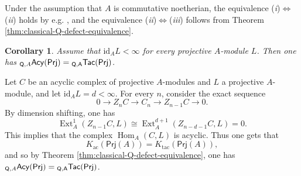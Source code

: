 \documentclass{amsart}
\theoremstyle{bfupright head,slanted body}
\theoremstyle{bfupright head,upright body}
\theoremstyle{fixed bf head,slanted body}
\newtheorem{cor}[res]{Corollary}        \newtheorem*{cor*}{Corollary}
\theoremstyle{fixed bf head,upright body}
\theoremstyle{numbered paragraph}
\newcounter{eqc}
\newenvironment{prf*}[1][Proof]{%
	\begin{proof}[\bf #1]
		\setcounter{equation}{0}
		\renewcommand{\theequation}{\arabic{equation}}}
	{\end{proof}
}
\newcommand{\eqclbl}[1]{{\upshape(\textit{#1})}}
\numberwithin{equation}{res}
\newcommand{\TacQ}{{}_{\Q,A}\mathsf{Tac}(\sf Prj)}
\newcommand{\AcQ}{{}_{\Q,A}\mathsf{Acy}(\sf Prj)}
\newcommand{\Prj}[1]{\mathsf{Prj}(#1)}
\newcommand{\Hom}{\operatorname{Hom}}
\newcommand{\Ext}[4][]{\operatorname{Ext}_{#1}^{#2}(#3,#4)}
\newcommand{\Q}{\mathsf{Q}}
\newcommand{\id}{\mathrm{id}}
\begin{document}
\begin{prf*}
Under the assumption that $A$ is commutative noetherian, the equivalence \eqclbl{i}$\Longleftrightarrow$\eqclbl{ii} holds by e.g. \cite[Theorem 19.5.25]{CFH24}, and the equivalence \eqclbl{ii}$\Longleftrightarrow$\eqclbl{iii} follows from Theorem \ref{thm:classical-Q-defect-equivalence}.
\end{prf*}

\begin{cor}\label{cor:finite-id-Q-defect}
Assume that $\id_A L<\infty$ for every projective $A$-module $L$. Then one has $\AcQ=\TacQ$.
\end{cor}

\begin{prf*}
Let $C$ be an acyclic complex of projective $A$-modules and $L$ a projective $A$-module, and let $\id_A L=d<\infty$. For every $n$, consider the exact sequence
$$0\to Z_nC\to C_n\to Z_{n-1}C \to 0.$$
By dimension shifting, one has
$$\Ext[A]{1}{Z_{n-1}C}{L}
\cong\Ext[A]{d+1}{Z_{n-d-1}C}{L}=0.$$
This implies that the complex $\Hom_A(C,L)$ is acyclic. Thus one gets that
$$K_{\mathrm{ac}}(\Prj A)=K_{\mathrm{tac}}(\Prj A),$$
and so by Theorem \ref{thm:classical-Q-defect-equivalence}, one has $\AcQ=\TacQ$.
\end{prf*}
\end{document}
